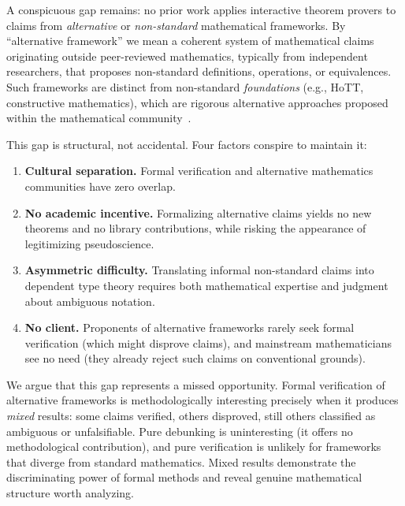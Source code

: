 \documentclass[runningheads]{llncs}
\begin{document}
A conspicuous gap remains: no prior work applies interactive theorem provers to
claims from \emph{alternative} or \emph{non-standard} mathematical frameworks.
By ``alternative framework'' we mean a coherent system of mathematical claims
originating outside peer-reviewed mathematics, typically from independent
researchers, that proposes non-standard definitions, operations, or equivalences.
Such frameworks are distinct from non-standard \emph{foundations} (e.g., HoTT,
constructive mathematics), which are rigorous alternative approaches proposed
within the mathematical community~\cite{shulman2024strange}.

This gap is structural, not accidental. Four factors conspire to maintain it:
\begin{enumerate}
\item \textbf{Cultural separation.} Formal verification and alternative
  mathematics communities have zero overlap.
\item \textbf{No academic incentive.} Formalizing alternative claims yields no
  new theorems and no library contributions, while risking the appearance of
  legitimizing pseudoscience.
\item \textbf{Asymmetric difficulty.} Translating informal non-standard claims
  into dependent type theory requires both mathematical expertise and judgment
  about ambiguous notation.
\item \textbf{No client.} Proponents of alternative frameworks rarely seek
  formal verification (which might disprove claims), and mainstream mathematicians
  see no need (they already reject such claims on conventional grounds).
\end{enumerate}

We argue that this gap represents a missed opportunity. Formal verification of
alternative frameworks is methodologically interesting precisely when it produces
\emph{mixed} results: some claims verified, others disproved, still others
classified as ambiguous or unfalsifiable. Pure debunking is uninteresting (it
offers no methodological contribution), and pure verification is unlikely for
frameworks that diverge from standard mathematics. Mixed results demonstrate the
discriminating power of formal methods and reveal genuine mathematical structure
worth analyzing.
\end{document}
